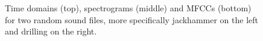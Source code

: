 \begin{figure} [H]%
	\centering
	
	\caption{Time domains (top), spectrograms (middle) and MFCCs (bottom) for two random sound files, more specifically jackhammer on the left and drilling on the right.}%
	\label{fig:comparison2}
\end{figure}